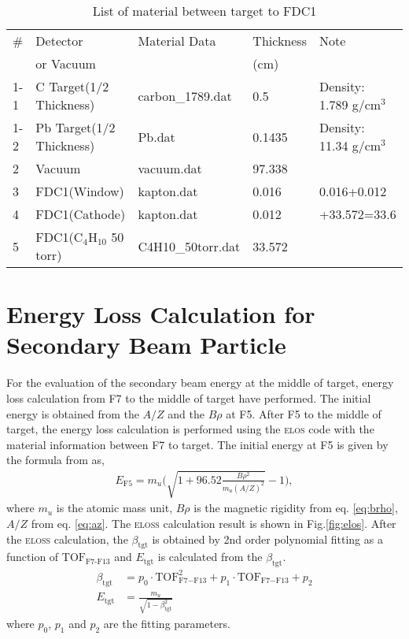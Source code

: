 \begin{table}[h]
    \centering
    \begin{tabular}{lllll} \\ \hline
    \# & Detector   & Material Data & Thickness & Note    \\
       & or Vacuum  &         & (cm)     & \\
    \hline
    1-1 & C Target(1/2 Thickness) & carbon\_1789.dat & 0.5 & Density: 1.789 g/cm$^3$  \\ 
    1-2 & Pb Target(1/2 Thickness) & Pb.dat & 0.1435 & Density: 11.34 g/cm$^3$  \\ \hline
    2 & Vacuum      & vacuum.dat  & 97.338   \\ \hline
    3 & FDC1(Window) & kapton.dat & 0.016   & 0.016+0.012 \\
    4 & FDC1(Cathode)   & kapton.dat & 0.012   & +33.572=33.6\\
    5 & FDC1(C$_4$H$_{10}$ 50 torr) & C4H10\_50torr.dat & 33.572 &  \\
    \hline
    \end{tabular}
    \caption{List of material between target to FDC1}
\end{table}

\clearpage

\section{Energy Loss Calculation for Secondary Beam Particle}
For the evaluation of the secondary beam energy at the middle of target, energy loss calculation from F7 to the middle of target have performed. The initial energy is obtained from the $A/Z$ and the $B\rho$ at F5. After F5 to the middle of target, the energy loss calculation is performed using the \textsc{elos} code with the material information between F7 to target. The initial energy at F5 is given by the formula from \cite{Defour} as,
\begin{align}
E_{\text{F5}} = m_u \bigg( \sqrt{1+96.52\frac{B\rho^2}{m_u (A/Z)^2}} -1 \bigg),
\end{align}
where $m_u$ is the atomic mass unit, $B\rho$ is the magnetic rigidity from eq. \ref{eq:brho}, $A/Z$ from eq. \ref{eq:az}. The \textsc{eloss} calculation result is shown in Fig.\ref{fig:elos}. After the \textsc{eloss} calculation, the $\beta_{\text{tgt}}$ is obtained by 2nd order polynomial fitting as a function of $\text{TOF}_{\text{F7-F13}}$ and $E_{\text{tgt}}$ is calculated from the $\beta_{\text{tgt}}$.
\begin{align}
    \beta_{\text{tgt}} &= p_0 \cdot \text{TOF}_{\text{F7}-\text{F13}}^2 + p_1 \cdot \text{TOF}_{\text{F7}-\text{F13}} + p_2 \\
    E_{\text{tgt}} &= \frac{m_u}{\sqrt{1-\beta_{\text{tgt}}^2}}
 \end{align}
where $p_0$, $p_1$ and $p_2$ are the fitting parameters.

